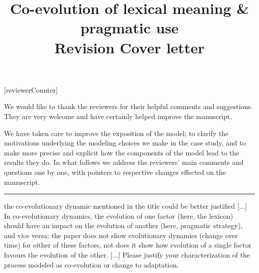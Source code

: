 \documentclass[12pt,a4paper]{article}
\begin{document}
[reviewerCounter]
	\date{}

\title{\Large Co-evolution of lexical meaning \& pragmatic use\\ {\bf Revision Cover letter}}

	\maketitle
\normalsize

We would like to thank the reviewers for their helpful comments and suggestions. They are very welcome and have certainly helped improve the manuscript. 

We have taken care to improve the exposition of the model; to clarify the  motivations underlying the modeling choices we make in the case study, and to make more precise and explicit how the components of the model lead to the results they do. In what follows we address the reviewers' main comments and questions one by one, with pointers to respective changes effected on the manuscript. 


\vspace{1cm}

%

\noindent\rule{\textwidth}{1pt}

\begin{mdframed}[backgroundcolor=gray!25,linecolor=gray!25,frametitle= Reviewer \thereviewerCounter~comment \thereviewerCommentCounter \hfill ~~({\it co-evolution})]
the co-evolutionary dynamic mentioned in the title could be better justified [...] In co-evolutionary dynamics, the evolution of one factor (here, the lexicon) should have an impact on the evolution of another (here, pragmatic strategy), and vice versa; the paper does not show evolutionary dynamics (change over time) for either of these factors, not does it show how evolution of a single factor favours the evolution of the other. [...] Please justify your characterization of the process modeled as co-evolution or change to adaptation.

\end{mdframed}
\end{document}
